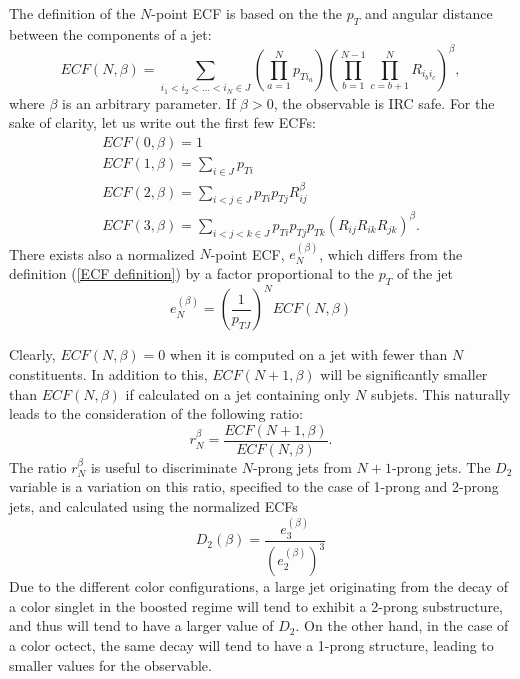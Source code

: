 \documentclass[10pt,a4paper]{book}
\begin{document}
The definition of the $N$-point ECF is based on the  the $p_T$ and angular distance between the components of a jet:
\begin{equation}
ECF(N,\beta) = \sum_{i_1 < i_2 < \dots < i_N \in J} \left( \prod_{a = 1}^N p_{Ti_a} \right) \left(\prod_{b = 1}^{N-1} \prod_{c = b + 1}^N  R_{i_b i_c}\right)^\beta,
\label{ECF definition}
\end{equation}
where $\beta$ is an arbitrary parameter. If $\beta > 0$, the observable is IRC safe. 
For the sake of clarity, let us write out the first few ECFs:
\begin{gather*}
ECF(0, \beta) = 1\\
ECF(1, \beta) = \sum_{i\in J}p_{Ti} \\
ECF(2, \beta) = \sum_{i < j \in J} p_{Ti}p_{Tj} R_{ij}^\beta \\
ECF(3, \beta) = \sum_{i < j < k \in J} p_{Ti}p_{Tj}p_{Tk} \left(R_{ij}R_{ik}R_{jk}\right)^\beta.
\end{gather*}
There exists also a normalized $N$-point ECF, $e^{(\beta)}_N$, which differs from the definition (\ref{ECF definition}) by a factor proportional to the $p_T$ of the jet
\begin{equation}
e^{(\beta)}_N = \left(\frac{1}{p_{TJ}}\right)^N ECF(N,\beta)
\end{equation}

Clearly, $ECF(N,\beta) = 0$ when it is computed on a jet with fewer than $N$ constituents. In addition to this, $ECF(N+1, \beta)$ will be significantly smaller than $ECF(N,\beta)$ if calculated on a jet containing only $N$ subjets. This naturally leads to the consideration of the following ratio:
\begin{equation}
r_N^\beta = \frac{ECF(N+1,\beta)}{ECF(N,\beta)}.
\end{equation}
The ratio $r_N^\beta$ is useful to discriminate $N$-prong jets from $N+1$-prong jets. The $D_2$ variable \cite{Larkoski:2014gra} is a variation on this ratio, specified to the case of 1-prong and 2-prong jets, and calculated using the normalized ECFs
\begin{equation}
D_2(\beta) = \frac{e^{(\beta)}_3}{(e^{(\beta)}_2)^3}
\end{equation}
Due to the different color configurations, a large jet originating from the decay of a color singlet in the boosted regime will tend to exhibit a 2-prong substructure, and thus will tend to have a larger value of $D_2$. On the other hand, in the case of a color octect, the same decay will tend to have a 1-prong structure, leading to smaller values for the observable.
\end{document}
